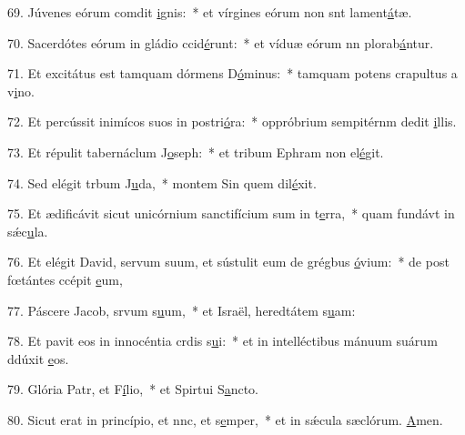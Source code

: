69. Júvenes eórum comdit \uline{i}gnis:~* et vírgines eórum non snt lament\uline{á}tæ.\par 
70. Sacerdótes eórum in gládio ccid\uline{é}runt:~* et víduæ eórum nn plorab\uline{á}ntur.\par 
71. Et excitátus est tamquam dórmens D\uline{ó}minus:~* tamquam potens crapultus a v\uline{i}no.\par 
72. Et percússit inimícos suos in postri\uline{ó}ra:~* oppróbrium sempitérnm dedit \uline{i}llis.\par 
73. Et répulit tabernáclum J\uline{o}seph:~* et tribum Ephram non el\uline{é}git.\par 
74. Sed elégit trbum J\uline{u}da,~* montem Sin quem dil\uline{é}xit.\par 
75. Et ædificávit sicut unicórnium sanctifícium sum in t\uline{e}rra,~* quam fundávt in sǽc\uline{u}la.\par 
76. Et elégit David, servum suum, et sústulit eum de grégbus \uline{ó}vium:~* de post fœtántes ccépit \uline{e}um,\par 
77. Páscere Jacob, srvum s\uline{u}um,~* et Israël, heredtátem s\uline{u}am:\par 
78. Et pavit eos in innocéntia crdis s\uline{u}i:~* et in intelléctibus mánuum suárum ddúxit \uline{e}os.\par 
79. Glória Patr, et F\uline{í}lio,~* et Spirtui S\uline{a}ncto.\par 
80. Sicut erat in princípio, et nnc, et s\uline{e}mper,~* et in sǽcula sæclórum. \uline{A}men.\par 
